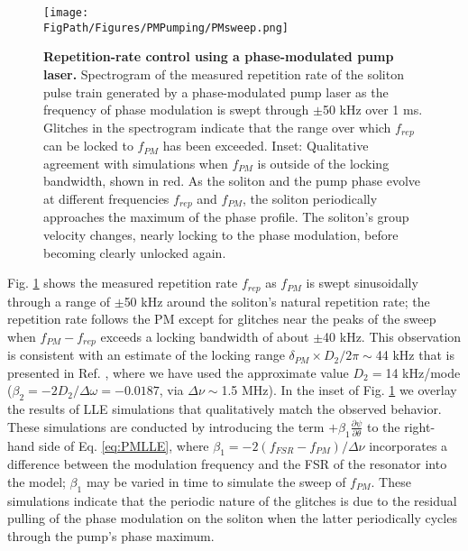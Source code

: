 \begin{figure}[htpb]
	\begin{center}
		\texttt{[image: \\FigPath/Figures/PMPumping/PMsweep.png]}
	\end{center}
	\caption[Repetition-rate control using a phase-modulated pump laser]{\textbf{Repetition-rate control using a phase-modulated pump laser.} Spectrogram of the measured repetition rate of the soliton pulse train generated by a phase-modulated pump laser as the frequency of phase modulation is swept through $\pm$50 kHz over 1 ms. Glitches in the spectrogram indicate that the range over which $f_{rep}$ can be locked to $f_{PM}$ has been exceeded. Inset: Qualitative agreement with simulations when $f_{PM}$ is outside of the locking bandwidth, shown in red. As the soliton and the pump phase evolve at different frequencies $f_{rep}$ and $f_{PM}$, the soliton periodically approaches the maximum of the phase profile. The soliton's group velocity changes, nearly locking to the phase modulation, before becoming clearly unlocked again.}
	\label{fig:PMsweep}
\end{figure} 

Fig. \ref{fig:PMsweep} shows the measured repetition rate $f_{rep}$ as $f_{PM}$ is swept sinusoidally through a range of $\pm$50 kHz around the soliton's natural repetition rate; the repetition rate follows the PM except for glitches near the peaks of the sweep when $f_{PM}-f_{rep}$ exceeds a locking bandwidth of about $\pm$40 kHz. This observation is consistent with an estimate of the locking range $\delta_{PM}\times D_2/2\pi\sim$44 kHz that is presented in Ref. , where we have used the approximate value $D_2=$14 kHz/mode ($\beta_2=-2D_2/\Delta\omega=-0.0187$, via $\Delta\nu\sim$1.5 MHz). In the inset of Fig. \ref{fig:PMsweep} we overlay the results of LLE simulations that qualitatively match the observed behavior. These simulations are conducted by introducing the term $+\beta_1\frac{\partial\psi}{\partial\theta}$ to the right-hand side of Eq. \ref{eq:PMLLE}, where $\beta_1=-2(f_{FSR}-f_{PM})/\Delta\nu$ incorporates a difference between the modulation frequency and the FSR of the resonator into the model; $\beta_1$ may be varied in time to simulate the sweep of $f_{PM}$. These simulations indicate that the periodic nature of the glitches is due to the residual pulling of the phase modulation on the soliton when the latter periodically cycles through the pump's phase maximum.



